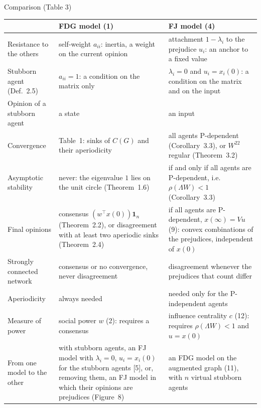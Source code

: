 
\begin{frame}[label=bk-table]{Comparison (Table 3)}
  \centering
  \scriptsize
  \renewcommand{\arraystretch}{0.95}
  \begin{tabular}{@{}>{\raggedright\arraybackslash}p{2.4cm}
                  >{\raggedright\arraybackslash}p{5.7cm}
                  >{\raggedright\arraybackslash}p{6.0cm}@{}}
    \toprule
    & FDG model (1) & FJ model (4) \\
    \midrule
    Resistance to the others
      & self-weight $a_{ii}$: inertia, a weight on the current opinion
      & attachment $1 - \lambda_i$ to the prejudice $u_i$: an anchor to a fixed value \\
    Stubborn agent (Def.~2.5)
      & $a_{ii} = 1$: a condition on the matrix only
      & $\lambda_i = 0$ and $u_i = x_i(0)$: a condition on the matrix and on the input \\
    Opinion of a stubborn agent & a state & an input \\
    Convergence
      & Table~1: sinks of $C(G)$ and their aperiodicity
      & all agents P-dependent (Corollary~3.3), or $W^{22}$ regular (Theorem~3.2) \\
    Asymptotic stability
      & never: the eigenvalue $1$ lies on the unit circle (Theorem~1.6)
      & if and only if all agents are P-dependent, i.e.\ $\rho(\Lambda W) < 1$
        (Corollary~3.3) \\
    Final opinions
      & consensus $(w^\top x(0))\mathbf{1}_n$ (Theorem~2.2), or disagreement with at least
        two aperiodic sinks (Theorem~2.4)
      & if all agents are P-dependent, $x(\infty) = Vu$ (9): convex combinations of the
        prejudices, independent of $x(0)$ \\
    Strongly connected network
      & consensus or no convergence, never disagreement
      & disagreement whenever the prejudices that count differ \\
    Aperiodicity & always needed & needed only for the P-independent agents \\
    Measure of power
      & social power $w$ (2): requires a consensus
      & influence centrality $c$ (12): requires $\rho(\Lambda W) < 1$ and $u = x(0)$ \\
    From one model to the other
      & with stubborn agents, an FJ model with $\lambda_i = 0$, $u_i = x_i(0)$ for the
        stubborn agents [5], or, removing them, an FJ model in which their opinions are
        prejudices (Figure~8)
      & an FDG model on the augmented graph (11), with $n$ virtual stubborn agents \\
    \bottomrule
  \end{tabular}
\end{frame}

